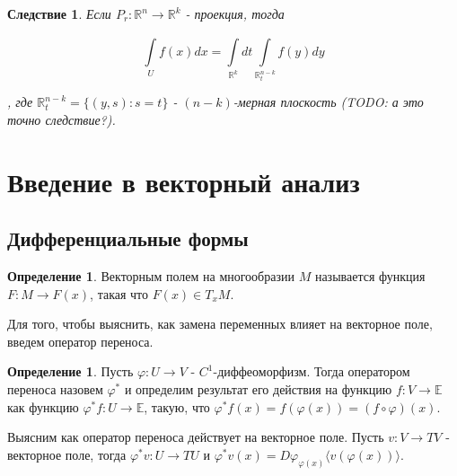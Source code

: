 \documentclass[a5paper]{article}
\newcounter{through}
\theoremstyle{plain}
\newtheorem{corollary}[through]{Следствие}
\theoremstyle{definition}
\newtheorem{definition}[through]{Определение}
\numberwithin{through}{section}
\numberwithin{equation}{section}
\begin{document}
\begin{corollary}
	Если $P_r : \mathbb{R}^n \to \mathbb{R}^k$ - проекция, тогда 
	
	\begin{equation*}
		\int\limits_{U}^{} f(x) dx = \int\limits_{\mathbb{R}^k}^{}dt \int\limits_{\mathbb{R}_t^{n-k}} f(y) dy
	\end{equation*}
	
	, где $\mathbb{R}_t^{n-k} = \{(y, s) : s=t\}$ - $(n-k)$-мерная плоскость (TODO: а это точно следствие?).
\end{corollary}

\section{Введение в векторный анализ}
\subsection{Дифференциальные формы}

\begin{definition}	Векторным полем на многообразии $M$ называется функция
	 $F : M \to F(x)$, такая что $F(x) \in T_{x}M$.
\end{definition}

Для того, чтобы выяснить, как замена переменных влияет на векторное поле, введем оператор переноса.

\begin{definition}
	Пусть $\varphi : U \to V$ - $C^1$-диффеоморфизм. Тогда оператором переноса  назовем $\varphi^{*}$ и определим результат его действия на функцию $f : V \to \mathbb{E}$ как функцию $\varphi^{*}f : U \to \mathbb{E}$, такую, что $\varphi^{*}f(x)=f(\varphi(x))=(f \circ \varphi)(x)$.
\end{definition}

Выясним как оператор переноса действует на векторное поле. Пусть $v : V \to TV$ - векторное поле, тогда $\varphi^{*}v : U \to TU$ и $\varphi^{*}v(x)=D\varphi_{\varphi(x)} \langle v(\varphi(x)) \rangle$.
\end{document}
